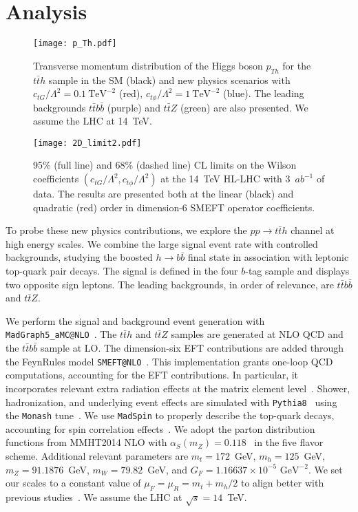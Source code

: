 \documentclass[reprint, aps,prd, preprintnumbers,groupedaddress,nofootinbib]{revtex4-1}
\begin{document}
\section{Analysis}
\label{sec:LHC}

\begin{figure}[b]
    \centering
    \texttt{[image: p\_Th.pdf]}
    \caption{Transverse momentum distribution of the Higgs boson $p_{Th}$ for the  $t\bar{t}h$ sample in the SM (black) and new physics scenarios with $c_{tG}/\Lambda^2=0.1~\text{TeV}^{-2}$ (red), $c_{t\phi}/\Lambda^2=1~\text{TeV}^{-2}$ (blue). The leading backgrounds $t\bar{t}b\bar{b}$ (purple) and $t\bar{t}Z$ (green)  are also presented.  We assume the LHC at 14~TeV.}
    \label{fig:pth_eft}
\end{figure}

\begin{figure}[t]
    \centering
    \texttt{[image: 2D\_limit2.pdf]}
    \caption{95\% (full line) and 68\% (dashed line) CL  limits on the Wilson coefficients $(c_{tG}/\Lambda^2,c_{t\phi}/\Lambda^2)$ at the 14~TeV HL-LHC with 3~$ab^{-1}$ of data. The results are presented both at the linear (black) and  quadratic (red) order in dimension-6 SMEFT operator coefficients.
    }
    \label{fig:limit_eft}
\end{figure}

To probe these new physics contributions, we explore the ${pp\to t\bar{t}h}$ channel at high energy scales. We combine the large signal event rate with controlled backgrounds, studying the boosted $h\rightarrow b\bar{b}$ final state in association with leptonic top-quark pair decays. The signal is defined in the four $b$-tag sample  and displays two opposite sign leptons. The leading backgrounds, in order of relevance, are $t\bar{t}b\bar{b}$ and $t\bar{t}Z$. 

We perform the signal and background event generation with {\tt MadGraph5\_aMC@NLO}~\cite{Alwall:2014hca}. The $t\bar{t}h$ and $t\bar{t}Z$ samples are generated at NLO QCD and the $t\bar{t}b\bar{b}$ sample at LO. The dimension-six EFT contributions are added through the FeynRules model {\tt SMEFT@NLO}~\cite{Degrande:2020evl}. This implementation grants one-loop QCD computations, accounting for the EFT contributions. In particular, it incorporates  relevant extra radiation effects at the matrix element level~\cite{Goldouzian:2020ekx}.  Shower, hadronization, and underlying event effects are simulated with {\tt Pythia8}~\cite{Sjostrand:2014zea} using the {\tt Monash} tune~\cite{Skands:2014pea}. We use {\tt MadSpin} to properly describe the top-quark decays, accounting for spin correlation effects~\cite{Artoisenet:2012st}. We adopt the parton distribution functions from MMHT2014 NLO with $\alpha_S(m_Z)=0.118$~\cite{Harland-Lang:2014zoa} in the five flavor scheme. Additional relevant parameters are $m_t=172$~GeV, $m_h=125$~GeV, $m_Z=91.1876$~GeV, $m_W=79.82$~GeV, and $G_F=1.16637\times 10^{-5}\text{~GeV}^{-2}$. We set our scales to a constant value of $\mu_F=\mu_R=m_t+m_h/2$ to align better with previous studies~\cite{Maltoni:2016yxb}. We assume the LHC at $\sqrt{s}=14$~TeV.
\end{document}
